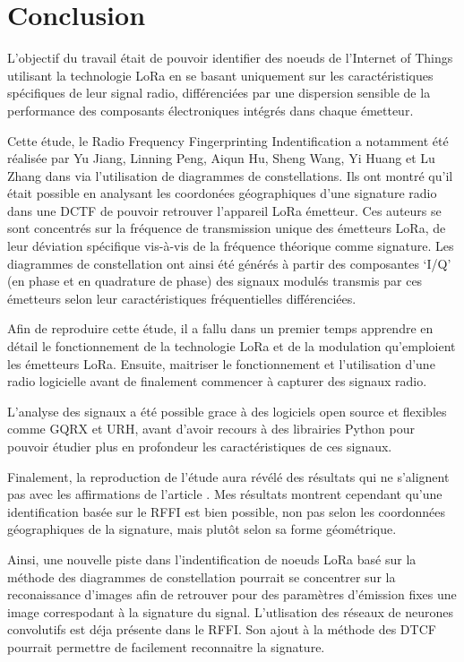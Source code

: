 \chapter*{Conclusion}
\renewcommand{\leftmark}{CONCLUSION}

L'objectif du travail était de pouvoir identifier des noeuds de l'Internet of Things utilisant la technologie LoRa en se basant uniquement sur les caractéristiques spécifiques de leur signal radio, différenciées par une dispersion sensible de la performance des composants électroniques intégrés dans chaque émetteur.
\vspace{0.1cm}

Cette étude, le Radio Frequency Fingerprinting Indentification a notamment été réalisée par Yu Jiang, Linning Peng, Aiqun Hu, Sheng Wang, Yi Huang et Lu Zhang dans \cite{loraDCTF} via l'utilisation de diagrammes de constellations. Ils ont montré qu'il était possible en analysant les coordonées géographiques d'une signature radio dans une DCTF de pouvoir retrouver l'appareil LoRa émetteur. Ces auteurs se sont concentrés sur la fréquence de transmission unique des émetteurs LoRa, de leur déviation spécifique vis-à-vis de la fréquence théorique comme signature. Les diagrammes de constellation ont ainsi été générés à partir des composantes ‘I/Q’ (en phase et en quadrature de phase) des signaux modulés transmis par ces émetteurs selon leur caractéristiques fréquentielles différenciées.

\vspace{0.1cm}

Afin de reproduire cette étude, il a fallu dans un premier temps apprendre en détail le fonctionnement de la technologie LoRa et  de la modulation qu'emploient les émetteurs LoRa. Ensuite, maitriser le fonctionnement et l'utilisation d'une radio logicielle avant de finalement commencer à capturer des signaux radio.

\vspace{0.1cm}

L'analyse des signaux a été possible grace à des logiciels open source et flexibles comme GQRX et URH, avant d'avoir recours à des librairies Python pour pouvoir étudier plus en profondeur les caractéristiques de ces signaux.

\vspace{0.1cm}

Finalement, la reproduction de l'étude aura révélé des résultats qui ne s'alignent pas avec les affirmations de l'article \cite{loraDCTF}. Mes résultats montrent cependant qu'une identification basée sur le RFFI est bien possible, non pas selon les coordonnées géographiques de la signature, mais plutôt selon sa forme géométrique.

\vspace{0.1cm}

Ainsi, une nouvelle piste dans l'indentification de noeuds LoRa basé sur la méthode des diagrammes de constellation pourrait se concentrer sur la reconaissance d'images afin de retrouver pour des paramètres d'émission fixes une image correspodant à la signature du signal. L'utlisation des réseaux de neurones convolutifs est déja présente dans le RFFI. Son ajout à la méthode des DTCF pourrait permettre de facilement reconnaitre la signature.